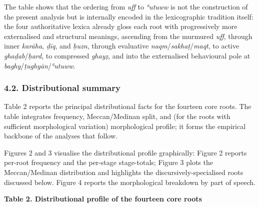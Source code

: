 The table shows that the ordering from \emph{uff} to \emph{ʿutuww} is
not the construction of the present analysis but is internally encoded
in the lexicographic tradition itself: the four authoritative lexica
already gloss each root with progressively more externalised and
structural meanings, ascending from the murmured \emph{uff}, through
inner \emph{karāha}, \emph{ḍīq}, and \emph{ḥuzn}, through evaluative
\emph{naqm}/\emph{sakhaṭ}/\emph{maqt}, to active
\emph{ghaḍab}/\emph{ḥard}, to compressed \emph{ghayẓ}, and into the
externalised behavioural pole at
\emph{baghy}/\emph{ṭughyān}/\emph{ʿutuww}.

\subsubsection{4.2. Distributional
summary}\label{distributional-summary}

Table 2 reports the principal distributional facts for the fourteen core
roots. The table integrates frequency, Meccan/Medinan split, and (for
the roots with sufficient morphological variation) morphological
profile; it forms the empirical backbone of the analyses that follow.

Figures 2 and 3 visualise the distributional profile graphically: Figure
2 reports per-root frequency and the per-stage stage-totals; Figure 3
plots the Meccan/Medinan distribution and highlights the
discursively-specialised roots discussed below. Figure 4 reports the
morphological breakdown by part of speech.

\textbf{Table 2. Distributional profile of the fourteen core roots}

